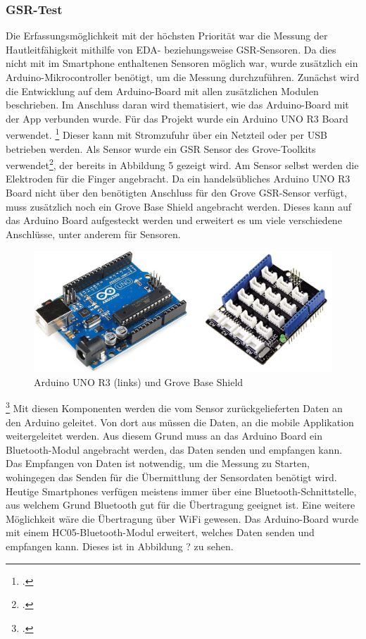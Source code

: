 \subsubsection{GSR-Test}
Die Erfassungsmöglichkeit mit der höchsten Priorität war die Messung der Hautleitfähigkeit mithilfe von EDA- beziehungsweise GSR-Sensoren. Da dies nicht mit im Smartphone enthaltenen Sensoren möglich war, wurde zusätzlich ein Arduino-Mikrocontroller benötigt, um die Messung durchzuführen. Zunächst wird die Entwicklung auf dem Arduino-Board mit allen zusätzlichen Modulen beschrieben. Im Anschluss daran wird thematisiert, wie das Arduino-Board mit der App verbunden wurde. \newline
Für das Projekt wurde ein Arduino UNO R3 Board verwendet. \footcite[Vgl.][]{Ard18} Dieser kann mit Stromzufuhr über ein Netzteil oder per USB betrieben werden. Als Sensor wurde ein GSR Sensor des Grove-Toolkits verwendet\footcite[Vgl.][]{Gro18}, der bereits in Abbildung 5 gezeigt wird. Am Sensor selbst werden die Elektroden für die Finger angebracht. Da ein handelsübliches Arduino UNO R3 Board nicht über den benötigten Anschluss für den Grove GSR-Sensor verfügt, muss zusätzlich noch ein Grove Base Shield angebracht werden. Dieses kann auf das Arduino Board aufgesteckt werden und erweitert es um viele verschiedene Anschlüsse, unter anderem für Sensoren.
\begin{figure}[h]
	\centering
	\includegraphics[width=16cm]{Bilder/arduino.jpg}
	\caption[Arduino UNO R3 (links) und Grove Base Shield]{Arduino UNO R3 (links) und Grove Base Shield\footnotemark}
\end{figure}%
\footcitetext[Bilder von:][]{Sou18, Rei18}
\newline \newline
Mit diesen Komponenten werden die vom Sensor zurückgelieferten Daten an den Arduino geleitet. Von dort aus müssen die Daten, an die mobile Applikation weitergeleitet werden. Aus diesem Grund muss an das Arduino Board ein Bluetooth-Modul angebracht werden, das Daten senden und empfangen kann. Das Empfangen von Daten ist notwendig, um die Messung zu Starten, wohingegen das Senden für die Übermittlung der Sensordaten benötigt wird. Heutige Smartphones verfügen meistens immer über eine Bluetooth-Schnittstelle, aus welchem Grund Bluetooth gut für die Übertragung geeignet ist. Eine weitere Möglichkeit wäre die Übertragung über WiFi gewesen. Das Arduino-Board wurde mit einem HC05-Bluetooth-Modul erweitert, welches Daten senden und empfangen kann. Dieses ist in Abbildung ? zu sehen.
